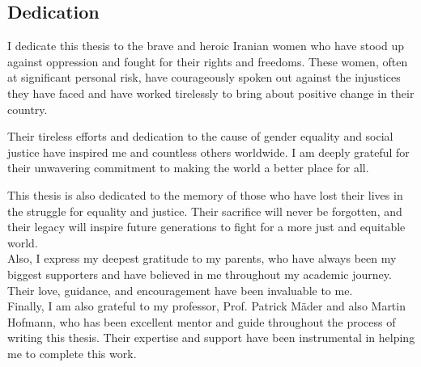 \subsection*{Dedication}

I dedicate this thesis to the brave and heroic Iranian women who have stood up against oppression and fought for their rights and freedoms. These women, often at significant personal risk, have courageously spoken out against the injustices they have faced and have worked tirelessly to bring about positive change in their country.

Their tireless efforts and dedication to the cause of gender equality and social justice have inspired me and countless others worldwide. I am deeply grateful for their unwavering commitment to making the world a better place for all.

This thesis is also dedicated to the memory of those who have lost their lives in the struggle for equality and justice. Their sacrifice will never be forgotten, and their legacy will inspire future generations to fight for a more just and equitable world.
\\
Also, I express my deepest gratitude to my parents, who have always been my biggest supporters and have believed in me throughout my academic journey. Their love, guidance, and encouragement have been invaluable to me.
\\
Finally, I am also grateful to my professor, Prof. Patrick Mäder and also Martin Hofmann, who has been excellent mentor and guide throughout the process of writing this thesis. Their expertise and support have been instrumental in helping me to complete this work.

\newpage